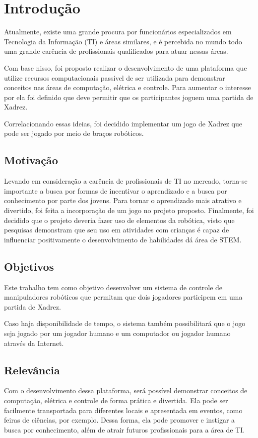 \chapter[Introdução]{Introdução}
\label{cap:introducao}

Atualmente, existe uma grande procura por funcionários especializados em Tecnologia da Informação (TI) e áreas similares,
e é percebida no mundo todo uma grande carência de profissionais qualificados para atuar nessas áreas.\cite{shortage_of_workers}

Com base nisso, foi proposto realizar o desenvolvimento de uma plataforma que utilize recursos computacionais passível de ser utilizada para demonstrar conceitos nas áreas de computação, elétrica e controle.
Para aumentar o interesse por ela foi definido que deve permitir que os participantes joguem uma partida de Xadrez.

Correlacionando essas ideias, foi decidido implementar um jogo de Xadrez que pode ser jogado por meio de braços robóticos.

\section[Motivação]{Motivação}

Levando em consideração a carência de profissionais de TI no mercado, torna-se importante a busca por formas de incentivar o aprendizado e a busca por conhecimento por parte dos jovens.
Para tornar o aprendizado mais atrativo e divertido, foi feita a incorporação de um jogo no projeto proposto.
Finalmente, foi decidido que o projeto deveria fazer uso de elementos da robótica, visto que pesquisas demonstram que seu uso em atividades com crianças é capaz de influenciar positivamente o desenvolvimento de habilidades dá área de STEM\cite{technology_for_stem}.

\section[Objetivos]{Objetivos}

Este trabalho tem como objetivo desenvolver um sistema de controle de manipuladores robóticos que permitam que dois jogadores participem em uma partida de Xadrez.

Caso haja disponibilidade de tempo, o sistema também possibilitará que o jogo seja jogado por um jogador humano e um computador ou jogador humano através da Internet.

\section[Relevância]{Relevância}

Com o desenvolvimento dessa plataforma, será possível demonstrar conceitos de computação, elétrica e controle de forma prática e divertida.
Ela pode ser facilmente transportada para diferentes locais e apresentada em eventos, como feiras de ciências, por exemplo.
Dessa forma, ela pode promover e instigar a busca por conhecimento, além de atrair futuros profissionais para a área de TI.
